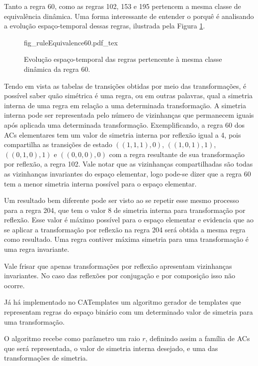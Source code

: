 Tanto a regra 60, como as regras 102, 153 e 195 pertencem a mesma classe de equivalência dinâmica. Uma forma interessante de entender o porquê é analisando a evolução espaço-temporal dessas regras, ilustrada pela Figura \ref{fig:dynamicEquivalecy}.

	\begin{figure}[h!]
	  \centering
	  \def\svgscale{0.63}
	  {fig_ruleEquivalence60.pdf_tex}
	  \caption{Evolução espaço-temporal das regras pertencente à mesma classe dinâmica da regra 60.}
	  \label{fig:dynamicEquivalecy}
	\end{figure}

Tendo em vista as tabelas de transições obtidas por meio das transformações, é possível saber quão simétrica é uma regra, ou em outras palavras, qual a simetria interna de uma regra em relação a uma determinada transformação. A simetria interna pode ser representada pelo número de vizinhanças que permanecem iguais após aplicada uma determinada transformação. Exemplificando, a regra 60 dos ACs elementares tem um valor de simetria interna por reflexão igual a 4, pois compartilha as transições de estado $((1,1,1),0)$, $((1,0,1),1)$, $((0,1,0),1)$ e $ ((0,0,0),0)$ com a regra resultante de sua transformação por reflexão, a regra 102. Vale notar que as vizinhanças compartilhadas são todas as vizinhanças invariantes do espaço elementar, logo pode-se dizer que a regra 60 tem a menor simetria interna possível para o espaço elementar.

Um resultado bem diferente pode ser visto ao se repetir esse mesmo processo para a regra 204, que tem o valor 8 de simetria interna para transformação por reflexão. Esse valor é máximo possível para o espaço elementar e evidencia que ao se aplicar a transformação por reflexão na regra 204 será obtida a mesma regra como resultado. Uma regra contiver máxima simetria para uma transformação é uma regra invariante.

Vale frisar que apenas transformações por reflexão apresentam vizinhanças invariantes. No caso das reflexões por conjugação e por composição isso não ocorre.

Já há implementado no CATemplates um algoritmo gerador de templates que representam regras do espaço binário com um determinado valor de simetria para uma transformação.

O algoritmo recebe como parâmetro um raio $r$, definindo assim a família de ACs que será representada, o valor de simetria interna desejado, e uma das transformações de simetria.

